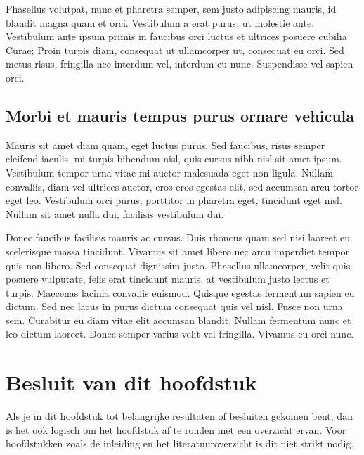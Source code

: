 Phasellus volutpat, nunc et pharetra semper, sem justo adipiscing mauris,
id blandit magna quam et orci. Vestibulum a erat purus, ut molestie ante.
Vestibulum ante ipsum primis in faucibus orci luctus et ultrices posuere
cubilia Curae; Proin turpis diam, consequat ut ullamcorper ut, consequat eu
orci. Sed metus risus, fringilla nec interdum vel, interdum eu nunc.
Suspendisse vel sapien orci.

\subsection{Morbi et mauris tempus purus ornare vehicula}
Mauris sit amet diam quam, eget luctus purus. Sed faucibus, risus semper
eleifend iaculis, mi turpis bibendum nisl, quis cursus nibh nisl sit amet
ipsum. Vestibulum tempor urna vitae mi auctor malesuada eget non ligula.
Nullam convallis, diam vel ultrices auctor, eros eros egestas elit, sed
accumsan arcu tortor eget leo. Vestibulum orci purus, porttitor in pharetra
eget, tincidunt eget nisl. Nullam sit amet nulla dui, facilisis vestibulum
dui.

Donec faucibus facilisis mauris ac cursus. Duis rhoncus quam sed nisi
laoreet eu scelerisque massa tincidunt. Vivamus sit amet libero nec arcu
imperdiet tempor quis non libero. Sed consequat dignissim justo. Phasellus
ullamcorper, velit quis posuere vulputate, felis erat tincidunt mauris, at
vestibulum justo lectus et turpis. Maecenas lacinia convallis euismod.
Quisque egestas fermentum sapien eu dictum. Sed nec lacus in purus dictum
consequat quis vel nisl. Fusce non urna sem. Curabitur eu diam vitae elit
accumsan blandit. Nullam fermentum nunc et leo dictum laoreet. Donec semper
varius velit vel fringilla. Vivamus eu orci nunc.

\section{Besluit van dit hoofdstuk}
Als je in dit hoofdstuk tot belangrijke resultaten of besluiten gekomen
bent, dan is het ook logisch om het hoofdstuk af te ronden met een
overzicht ervan. Voor hoofdstukken zoals de inleiding en het
literatuuroverzicht is dit niet strikt nodig.

